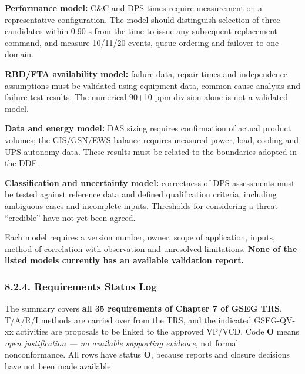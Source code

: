 \textbf{Performance model:} C\&C and DPS times require measurement on a representative configuration. The model should distinguish selection of three candidates within 0.90 s from the time to issue any subsequent replacement command, and measure 10/\allowbreak{}11/\allowbreak{}20 events, queue ordering and failover to one domain.

\textbf{RBD/\allowbreak{}FTA availability model:} failure data, repair times and independence assumptions must be validated using equipment data, common-cause analysis and failure-test results. The numerical 90+10 ppm division alone is not a validated model.

\textbf{Data and energy model:} DAS sizing requires confirmation of actual product volumes; the GIS/\allowbreak{}GSN/\allowbreak{}EWS balance requires measured power, load, cooling and UPS autonomy data. These results must be related to the boundaries adopted in the DDF.

\textbf{Classification and uncertainty model:} correctness of DPS assessments must be tested against reference data and defined qualification criteria, including ambiguous cases and incomplete inputs. Thresholds for considering a threat “credible” have not yet been agreed.

Each model requires a version number, owner, scope of application, inputs, method of correlation with observation and unresolved limitations. \textbf{None of the listed models currently has an available validation report.}

\subsubsection{8.2.4. Requirements Status Log}\label{ddjf-8-2-4}

The summary covers \textbf{all 35 requirements of Chapter 7 of GSEG TRS}. T/\allowbreak{}A/\allowbreak{}R/\allowbreak{}I methods are carried over from the TRS, and the indicated GSEG-QV-xx activities are proposals to be linked to the approved VP/\allowbreak{}VCD. Code \textbf{O} means \emph{open justification — no available supporting evidence}, not formal nonconformance. All rows have status \textbf{O}, because reports and closure decisions have not been made available.

